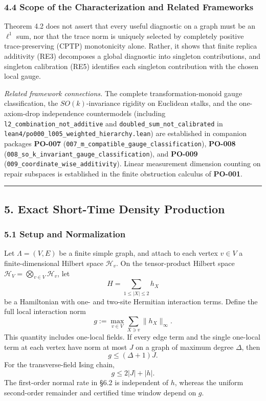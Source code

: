 \documentclass[
  11pt,
]{article}
\begin{document}
\subsubsection{4.4 Scope of the Characterization and Related Frameworks}\label{scope-of-the-characterization-and-related-frameworks}

Theorem 4.2 does not assert that every useful diagnostic on a graph must be an \(\ell^1\) sum, nor that the trace norm is uniquely selected by completely positive trace-preserving (CPTP) monotonicity alone. Rather, it shows that finite replica additivity (RE3) decomposes a global diagnostic into singleton contributions, and singleton calibration (RE5) identifies each singleton contribution with the chosen local gauge.

\emph{Related framework connections.} The complete transformation-monoid gauge classification, the \(SO(k)\)-invariance rigidity on Euclidean stalks, and the one-axiom-drop independence countermodels (including \texttt{l2\_combination\_not\_additive} and \texttt{doubled\_sum\_not\_calibrated} in \texttt{lean4/po000\_l005\_weighted\_hierarchy.lean}) are established in companion packages \textbf{PO-007} (\texttt{007\_m\_compatible\_gauge\_classification}), \textbf{PO-008} (\texttt{008\_so\_k\_invariant\_gauge\_classification}), and \textbf{PO-009} (\texttt{009\_coordinate\_wise\_additivity}). Linear measurement dimension counting on repair subspaces is established in the finite obstruction calculus of \textbf{PO-001}.

\begin{center}\rule{0.5\linewidth}{0.5pt}\end{center}

\subsection{5. Exact Short-Time Density Production}\label{exact-short-time-density-production}

\subsubsection{5.1 Setup and Normalization}\label{setup-and-normalization}

Let \(\Lambda=(V,E)\) be a finite simple graph, and attach to each vertex \(v\in V\) a finite-dimensional Hilbert space \(\mathcal H_v\). On the tensor-product Hilbert space \(\mathcal H_V = \bigotimes_{v\in V}\mathcal H_v\), let
\[
H=\sum_{1\le |X|\le2}h_X
\]
be a Hamiltonian with one- and two-site Hermitian interaction terms. Define the full local interaction norm
\[
g:=\max_{v\in V}\sum_{X\ni v}\lVert h_X\rVert_\infty.
\]
This quantity includes one-local fields. If every edge term and the single one-local term at each vertex have norm at most \(J\) on a graph of maximum degree \(\Delta\), then
\[
g\le(\Delta+1)J.
\]
For the transverse-field Ising chain,
\[
g\le2|J|+|h|.
\]
The first-order normal rate in §6.2 is independent of \(h\), whereas the uniform second-order remainder and certified time window depend on \(g\).
\end{document}
